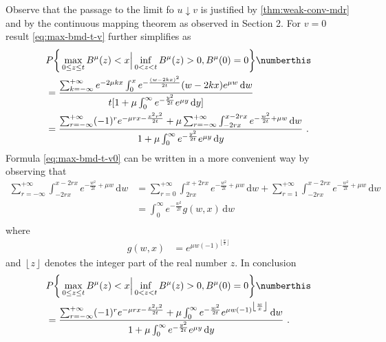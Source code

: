 %
%
%
Observe that the passage to the limit fo $ u \downarrow v $ is justified by \autoref*{thm:weak-conv-mdr} and by the continuous mapping theorem as observed
in Section 2.  For $ v=0 $ result \eqref{eq:max-bmd-t-v} further simplifies as 
%
\begin{align*}
&
P\bigg\{ \max_{0 \leq z \leq t} B^\mu(z) <x \Big |  \inf_{0 < z < t} B^\mu (z) > 0, B^\mu(0) = 0  \bigg\}
\numberthis 
\label{eq:max-bmd-t-v0}
\\
&=
\frac{  
	\sum_{k = -\infty} ^ { + \infty}
	e^{  - 2 \mu k x  }
	\int_0^{x}
	e^ {   -  \frac{(w  - 2kx)^2}{2t}  }
	(w- 2kx )
	e^{ \mu w } \, \mathrm d w
}{
	t[ 1 + \mu \int_0^\infty 
	e^{  - \frac{y^2}{2t}  } 
	e^{ \mu y } \,\mathrm d y	]
}
\\
%
%
&=
%
\frac{  
	\sum_{r = -\infty} ^ { + \infty}
	(-1)^r
	e^{  -  \mu r x - \frac{x^2 r^2}{2t}  } 
	+ \mu
	\sum_{r = -\infty}^{+ \infty}
	\int_{- 2 rx}^{x - 2 r x }
	e^ {   -  \frac{w ^2}{2t}  + \mu w}
 \, \mathrm d w
}{
	1 + \mu \int_0^\infty 
	e^{  - \frac{y^2}{2t}  } 
	e^{ \mu y } \,\mathrm d y	
} \, \, .
\end{align*}
%
%
Formula \eqref{eq:max-bmd-t-v0} can be written in a more convenient way by observing that 
%
%
\begin{align*}
	\sum_{r=-\infty}^{+ \infty } 
	\int_{- 2 r x } ^ { x - 2 r x } 
	e^ {   -  \frac{w ^2}{2t}  + \mu w}
	\, \mathrm d w 
	&=
	\sum_{  r = 0 } ^ {+ \infty}  
	\int_{ 2 r x } ^ { x + 2 r x } 
	e^ {   -  \frac{w ^2}{2t}  + \mu w}
	\, \mathrm d w 
	+ 
	\sum_{  r = 1 } ^ {+ \infty}  
	\int_{-  2 r x } ^ { x  -  2 r x } 
	e^ {   -  \frac{w ^2}{2t}  + \mu w}
	\, \mathrm d w 
	\\
	&=
	\int_0^\infty e^{ - \frac{w^2}{2t} } g (w, x) \,\mathrm d w 
	\\
\end{align*}
%
where 
\begin{align*}
g(w, x)
&= e^{ \mu w (-1)^{ \left \lfloor \frac w x \right \rfloor} }
\end{align*}
and $  \left \lfloor  z \right \rfloor  $ denotes the integer part of the real number $ z $.
%
%
In conclusion
\begin{align*}
&
P\bigg\{ \max_{0 \leq z \leq t} B^\mu(z) <x \Big |  \inf_{0 < z < t} B^\mu (z) > 0, B^\mu(0) = 0  \bigg\}
\label{eq:max-bmd-t-v0-fin}
\numberthis
\\
&=
\frac{  
	\sum_{r = -\infty} ^ { + \infty}
	(-1)^r
	e^{  -  \mu r x - \frac{x^2 r^2}{2t}  } 
	+ \mu
	\int_0^\infty e^{ - \frac{w^2}{2t} } e^{ \mu w (-1)^{ \left \lfloor \frac w x \right \rfloor} } \,\mathrm d w
}{
	1 + \mu \int_0^\infty 
	e^{  - \frac{y^2}{2t}  } 
	e^{ \mu y } \,\mathrm d y	
} \,\, .
\end{align*}
